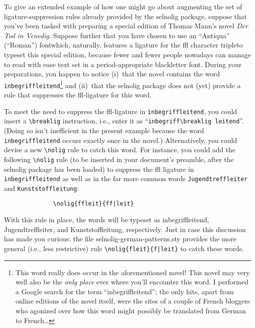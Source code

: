 \documentclass[11pt]{article}
\newcommand{\pkg}[1]{\textsf{#1}}
\newcommand{\opt}[1]{\texttt{#1}}
\newcommand{\cmmd}[1]{\texttt{\textbackslash #1}}
\begin{document}
To give an extended example of how one might go about augmenting the set of ligature-suppression rules already provided by the \pkg{selnolig} package, suppose that you've been tasked with preparing a special edition of Thomas Mann's novel \emph{Der Tod in Venedig}. Suppose further that you have chosen to use an \enquote{Antiqua} (\enquote{Roman}) font\textemdash which, naturally, features a ligature for the ffl character triple\textemdash to typeset this special edition,  because fewer and fewer people nowadays can manage to read with ease text set in a {\blackletter period-appropriate blackletter font}. During your preparations, you happen to notice (i)~that the novel contains the word \opt{inbegriffleitend}\footnote{This word really does occur in the aforementioned novel! This novel may very well also be the \emph{only place} ever where you'll encounter this word. I performed a Google search for the term \enquote{inbegriffleitend}; the only hits, apart from online editions of the novel itself, were the sites of a couple of French bloggers who agonized over how this word might possibly be translated from German to French\dots} and (ii)~that the \pkg{selnolig} package does not (yet) provide a rule that suppresses the ffl-ligature for this word. 

To meet the need to suppress the ffl-ligature in \opt{inbegriffleitend}, you could insert a \cmmd{breaklig} instruction, i.e., enter it as ``\Verb|inbegriff\breaklig leitend|''. (Doing so isn't inefficient in the present example because the word \opt{inbegriffleitend} occurs exactly once in the novel.) Alternatively, you could devise a new \cmmd{nolig} rule to catch this word. For instance, you could add the following \cmmd{nolig} rule (to be inserted in your document's preamble, after the \pkg{selnolig} package has been loaded) to suppress the ffl ligature in  \opt{inbegriffleitend} as well as in the far more common words \opt{Jugendtreffleiter} and \opt{Kunststoffleitung}:
\begin{Verbatim}
              \nolig{ffleit}{ff|leit}
\end{Verbatim}
With this rule in place, the words will be typeset as inbegriffleitend, Jugendtreffleiter, and Kunststoffleitung, respectively. Just in case this discussion has made you curious: the file \pkg{selnolig-german-patterns.sty} provides the more general (i.e., less restrictive) rule \Verb+\nolig{fleit}{f|leit}+ to catch these words.
\end{document}
